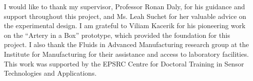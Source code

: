 
\begin{acknowledgements}

I would like to thank my supervisor, Professor Ronan Daly, for his guidance and support throughout this project, and Ms. Leah Suchet for her valuable advice on the experimental design. I am grateful to Viliam Kacerik for his pioneering work on the ``Artery in a Box'' prototype, which provided the foundation for this project. I also thank the Fluids in Advanced Manufacturing research group at the Institute for Manufacturing for their assistance and access to laboratory facilities. This work was supported by the EPSRC Centre for Doctoral Training in Sensor Technologies and Applications.

\end{acknowledgements}
